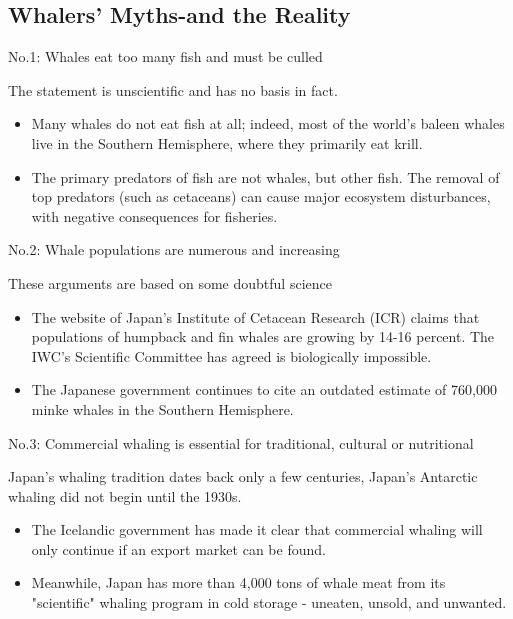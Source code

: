 \documentclass[hyperref={unicode}]{beamer}
\begin{document}
\begin{CJK}{UTF8}{gkai}
\section{Whalers' Myths-and the Reality}
\begin{frame}{No.1: Whales eat too many fish and must be culled}
  \begin{block}{The statement is unscientific and has no basis in fact.}
    \begin{itemize}
    \item Many whales do not eat fish at all; indeed, most of the world's baleen whales live in the Southern Hemisphere, where they primarily eat krill.
      \pause
    \item The primary predators of fish are not whales, but other fish. The removal of top predators (such as cetaceans) can cause major ecosystem disturbances, with negative consequences for fisheries.
    \end{itemize}
  \end{block}
\end{frame}

\begin{frame}{No.2: Whale populations are numerous and increasing}
  \begin{block}{These arguments are based on some doubtful science}
    \begin{itemize}
    \item The website of Japan's Institute of Cetacean Research (ICR) claims that populations of humpback and fin whales are growing by 14-16 percent. The IWC's Scientific Committee has agreed is biologically impossible.
      \pause
    \item The Japanese government continues to cite an outdated estimate of 760,000 minke whales in the Southern Hemisphere.
    \end{itemize}
  \end{block}
\end{frame}
\begin{frame}{No.3: Commercial whaling is essential for traditional, cultural or nutritional}
  \begin{block}{Japan's whaling tradition dates back only a few centuries, Japan's Antarctic whaling did not begin until the 1930s.}
    \begin{itemize}
    \item The Icelandic government has made it clear that commercial whaling will only continue if an export market can be found.
      \pause
     \item Meanwhile, Japan has more than 4,000 tons of whale meat from its "scientific" whaling program in cold storage - uneaten, unsold, and unwanted.
    \end{itemize}
  \end{block}
\end{frame}


\end{CJK}
\end{document}
